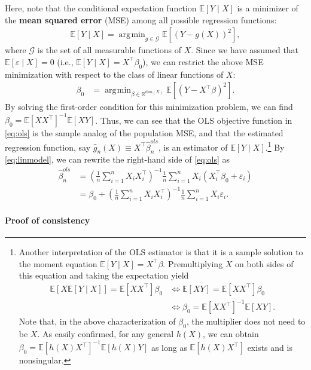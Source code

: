 \documentclass[10.5pt, A4paper, openany, uplatex]{book}
\newcommand{\mcl}{\mathcal}
\newcommand{\mbb}{\mathbb}
\newcommand{\eps}{\varepsilon}
\newcommand{\E}{\mathbb{E}}
\renewcommand{\hat}{\widehat}
\numberwithin{equation}{section}
\DeclareMathOperator*{\argmin}{\arg\!\min}
\begin{document}
Here, note that the conditional expectation function $\E[Y \mid X]$ is a minimizer of the \textbf{mean squared error} (MSE) among all possible regression functions:
\begin{align}\label{eq:msemin}
	\E[Y \mid X] = \argmin_{g \in \mcl{G}} \E[(Y - g(X))^2],
\end{align}
where $\mcl{G}$ is the set of all measurable functions of $X$.
Since we have assumed that $\E[\eps \mid X] = 0 $ (i.e., $\E [Y \mid X] = X^\top \beta_0$), we can restrict the above MSE minimization with respect to the class of linear functions of $X$:
\begin{align*}
	\beta_0 
	& = \argmin_{\beta \in \mbb{R}^{\text{dim}(X)}} \E[(Y - X^\top \beta)^2].
\end{align*} 
By solving the first-order condition for this minimization problem, we can find $\beta_0 = \E[XX^\top]^{-1} \E[XY]$.
Thus, we can see that the OLS objective function in \eqref{eq:ols} is the sample analog of the population MSE, and that the estimated regression function, say $\hat g_n(X) \equiv X^\top \hat \beta_n^{ols}$, is an estimator of $\E[Y \mid X]$.\footnote{\label{foot:ols_moment}
	Another interpretation of the OLS estimator is that it is a sample solution to the moment equation $\E[Y \mid X] = X^\top\beta$.
	Premultiplying $X$ on both sides of this equation and taking the expectation yield
	\begin{align*}
		\E[X \E[Y \mid X]] = \E[XX^\top]\beta_0
		& \iff \E[XY] = \E[XX^\top]\beta_0 \\
		& \iff \beta_0 = \E[XX^\top]^{-1}\E[XY].
	\end{align*}
	Note that, in the above characterization of $\beta_0$, the multiplier does not need to be $X$.
	As easily confirmed, for any general $h(X)$, we can obtain $\beta_0 = \E[h(X)X^\top]^{-1}\E[h(X)Y]$ as long as $\E[h(X)X^\top]$ exists and is nonsingular.
	}
	By \eqref{eq:linmodel}, we can rewrite the right-hand side of \eqref{eq:ols} as
\begin{align*}
	\hat \beta_n^{ols} 
	& = \left(\frac{1}{n}\sum_{i = 1}^n X_i X_i^\top \right)^{-1}\frac{1}{n}\sum_{i = 1}^n X_i (X_i^\top\beta_0 + \eps_i) \\
	& = \beta_0 + \left(\frac{1}{n}\sum_{i = 1}^n X_i X_i^\top \right)^{-1}\frac{1}{n}\sum_{i = 1}^n X_i \eps_i.
\end{align*}

\paragraph{Proof of consistency}
\end{document}
